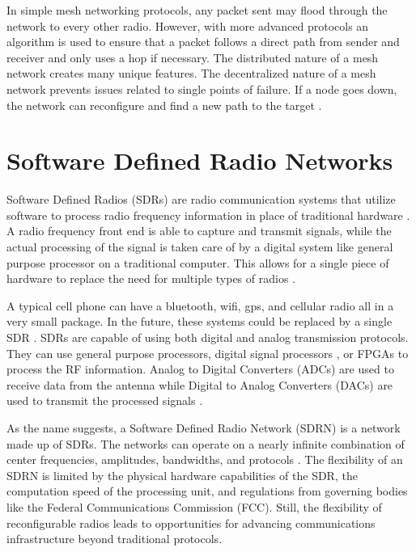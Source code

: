 In simple mesh networking protocols, any packet sent may flood through the network to every other radio. However, with more advanced protocols an algorithm is used to ensure that a packet follows a direct path from sender and receiver and only uses a hop if necessary. The distributed nature of a mesh network creates many unique features. The decentralized nature of a mesh network prevents issues related to single points of failure. If a node goes down, the network can reconfigure and find a new path to the target \cite{0033}. 


\section{Software Defined Radio Networks}

Software Defined Radios (SDRs) are radio communication systems that utilize software to process radio frequency information in place of traditional hardware \cite{761033}. A radio frequency front end is able to capture and transmit signals, while the actual processing of the signal is taken care of by a digital system like general purpose processor on a traditional computer. This allows for a single piece of hardware to replace the need for multiple types of radios \cite{393001}.

A typical cell phone can have a bluetooth, wifi, gps, and cellular radio all in a very small package. In the future, these systems could be replaced by a single SDR \cite{393001}. SDRs are capable of using both digital and analog transmission protocols. They can use general purpose processors, digital signal processors \cite{393001}, or FPGAs \cite{5747366} to process the RF information. Analog to Digital Converters (ADCs) are used to receive data from the antenna while Digital to Analog Converters (DACs) are used to transmit the processed signals . 

As the name suggests, a Software Defined Radio Network (SDRN) is a network made up of SDRs. The networks can operate on a nearly infinite combination of center frequencies, amplitudes, bandwidths, and protocols \cite{7039225}. The flexibility of an SDRN is limited by the physical hardware capabilities of the SDR, the computation speed of the processing unit, and regulations from governing bodies like the Federal Communications Commission (FCC). Still, the flexibility of reconfigurable radios leads to opportunities for advancing communications infrastructure beyond traditional protocols. 

